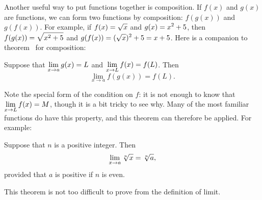Another useful way to put functions together is
composition. If $f(x)$ and $g(x)$ are
functions, we can form two functions by composition: $f(g(x))$ and
$g(f(x))$. For example, if $\displaystyle f(x)=\sqrt{x}$ and $\displaystyle \displaystyle
g(x)=x^2+5$, then $\displaystyle f(g(x))=\sqrt{x^2+5}$ and $\displaystyle
g(f(x))=(\sqrt{x})^2+5=x+5$.  Here is a companion to
theorem~ for composition:

\begin{theorem} Suppose that $\displaystyle \lim_{x\to a}g(x)=L$ and $\displaystyle \lim_{x\to L}f(x)=f(L)$. Then
$$\lim_{x\to a} f(g(x)) = f(L).$$
\label{thm:limit of composition}
\end{theorem}

Note the special form of the condition on $f$: it is not enough to
know that $\displaystyle\lim_{x\to L}f(x) = M$, though it is a bit tricky to see
why. Many of the most familiar functions do have this property, and
this theorem can therefore be applied. For example:

\begin{theorem} Suppose that $n$ is a positive integer. Then
$$\lim_{x\to a}\root n\of{x} = \root n\of{a},$$
provided that $a$ is positive if $n$ is even.
\label{thm:continuity of roots}
\end{theorem}

This theorem is not too difficult to prove from the definition of limit.








